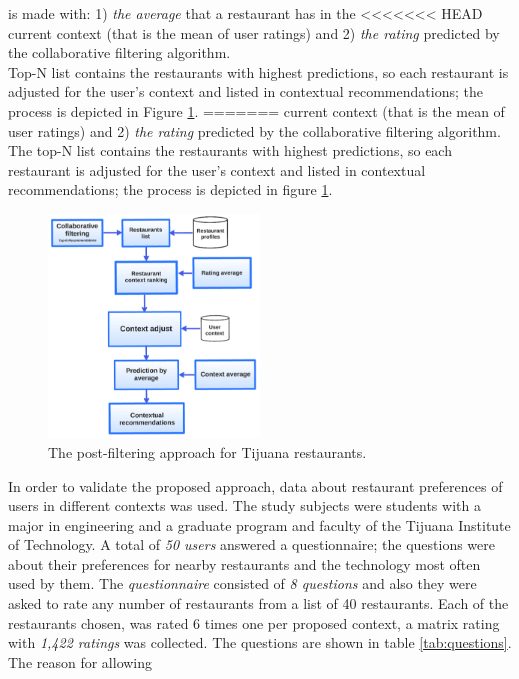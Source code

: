 is made with: 1) \textit{the average} that a restaurant has in the
<<<<<<< HEAD
current context (that is the  mean of user ratings) and 2)  
 \textit{the rating} predicted by the collaborative filtering algorithm.\\ 
Top-N list contains the restaurants with highest predictions, 
so each restaurant is adjusted for the user's context and listed in 
contextual recommendations; the process is depicted in 
Figure  \ref{fig:postfiltering}.
=======
current context (that is the  mean of user ratings) and 2) 
\textit{the rating} predicted by the collaborative filtering algorithm. 
The top-N list contains the restaurants with highest predictions, 
so each restaurant is adjusted for the user's context and listed in 
contextual recommendations; the process is depicted in figure
\ref{fig:postfiltering}.
\begin{figure}
\centering
\captionsetup{font=footnotesize}
\setlength\fboxsep{0pt}
\includegraphics[width=0.50\textwidth]{img/posfil.png}
\caption{The post-filtering approach for Tijuana restaurants.}
\label{fig:postfiltering}     
\end{figure}
In order to validate the proposed approach,  data  about 
restaurant preferences of users in different contexts was used.
The study subjects were students  with a major in engineering and  
a graduate program and faculty of the Tijuana Institute of
Technology. A total of \textit{50 users} answered a questionnaire; the
questions were about their preferences for nearby restaurants and the
technology most often used by them. The \textit{questionnaire} consisted 
of \textit{8 questions} and also they were asked to rate any number 
of restaurants from a list of 40 restaurants.
Each of the restaurants chosen, was rated 6 times one per proposed 
context, a matrix rating with \textit{1,422 ratings} was collected. The
questions are shown in table \ref{tab:questions}. The reason for allowing
